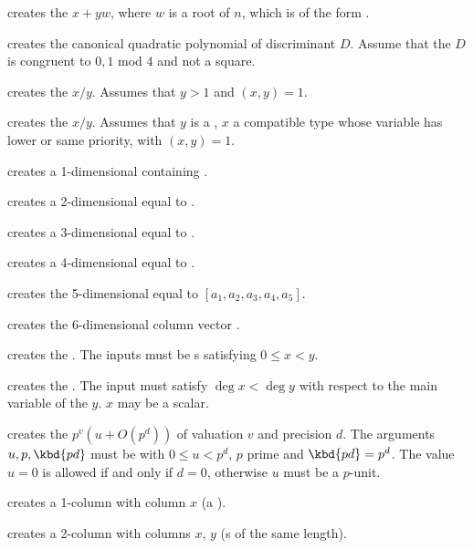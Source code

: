  creates the  $x + yw$,
where $w$ is a root of $n$, which is of the form .

 creates the canonical quadratic polynomial of
discriminant $D$. Assume that the  $D$ is congruent to $0,1$ mod $4$
and not a square.

 creates the  $x/y$. Assumes that
$y > 1$ and $(x,y) = 1$.

 creates the  $x/y$. Assumes
that $y$ is a , $x$ a compatible type whose variable has lower
or same priority, with $(x,y) = 1$.

 creates a 1-dimensional  containing .

 creates a 2-dimensional  equal to
\kbd{[x,y]}.

 creates a 3-dimensional 
equal to \kbd{[x,y,z]}.

 creates a 4-dimensional 
equal to \kbd{[x,y,z,t]}.

 creates the
5-dimensional  equal to $[a_1,a_2,a_3,a_4,a_5]$.

creates the $6$-dimensional column vector \kbd{[x,y,z,t,u,v]~}.

 creates the  .
The inputs must be s satisfying $0 \leq x < y$.

 creates the  .
The input must satisfy $\deg x < \deg y$ with respect to the main variable of
the  $y$. $x$ may be a scalar.

 creates the
 $p^v(u + O(p^d))$ of valuation $v$ and precision $d$.
The arguments $u, p, \kbd{pd}$ must be  with $0 \leq u < p^d$,
$p$ prime and $\kbd{pd} = p^d$. The value $u = 0$ is allowed if and only if
$d = 0$, otherwise $u$ must be a $p$-unit.

 creates a 1-column  with column $x$
(a ).

 creates a 2-column  with columns
$x$, $y$ (s of the same length).

